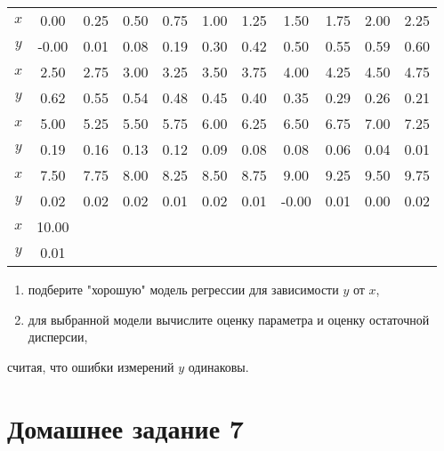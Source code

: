 \documentclass[a4paper,12pt]{article}
\newif\ifsolutions
\begin{document}
\begin{center}
    \begin{tabular}{|c|c|c|c|c|c|c|c|c|c|c|}
        \hline
        $x$ & 0.00  & 0.25                  & 0.50 & 0.75 & 1.00 & 1.25 & 1.50  & 1.75 & 2.00 & 2.25 \\
        $y$ & -0.00 & 0.01                  & 0.08 & 0.19 & 0.30 & 0.42 & 0.50  & 0.55 & 0.59 & 0.60 \\
        \hline
        \hline
        $x$ & 2.50  & 2.75                  & 3.00 & 3.25 & 3.50 & 3.75 & 4.00  & 4.25 & 4.50 & 4.75 \\
        $y$ & 0.62  & 0.55                  & 0.54 & 0.48 & 0.45 & 0.40 & 0.35  & 0.29 & 0.26 & 0.21 \\
        \hline
        \hline
        $x$ & 5.00  & 5.25                  & 5.50 & 5.75 & 6.00 & 6.25 & 6.50  & 6.75 & 7.00 & 7.25 \\
        $y$ & 0.19  & 0.16                  & 0.13 & 0.12 & 0.09 & 0.08 & 0.08  & 0.06 & 0.04 & 0.01 \\
        \hline
        \hline
        $x$ & 7.50  & 7.75                  & 8.00 & 8.25 & 8.50 & 8.75 & 9.00  & 9.25 & 9.50 & 9.75 \\
        $y$ & 0.02  & 0.02                  & 0.02 & 0.01 & 0.02 & 0.01 & -0.00 & 0.01 & 0.00 & 0.02 \\
        \hline
        \hline
        $x$ & 10.00 & \multicolumn{9}{l|}{}                                                          \\
        $y$ & 0.01  & \multicolumn{9}{l|}{}                                                          \\
        \hline
    \end{tabular}
\end{center}

\begin{enumerate}
    \item подберите "хорошую"{} модель регрессии для зависимости $y$ от $x$,
    \item для выбранной модели вычислите оценку параметра и оценку остаточной дисперсии,
\end{enumerate}
считая, что ошибки измерений $y$ одинаковы.

\ifsolutions
    Решение:

    Зависимость $y = x^{2.7} e^{-1.2x} + \varepsilon$.
\fi

\section*{Домашнее задание 7}
\end{document}
